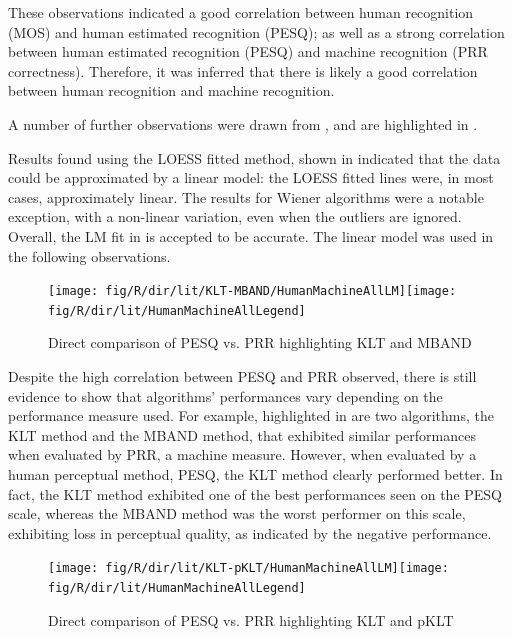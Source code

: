 These observations indicated a good correlation between human recognition
(\ac{MOS}) and human estimated recognition (\ac{PESQ}); as well
as a strong correlation between human estimated recognition (\ac{PESQ})
and machine recognition (\ac{PRR} correctness). Therefore, it was
inferred that there is likely a good correlation between human recognition
and machine recognition.

A number of further observations were drawn from ,
and are highlighted in .

Results found using the \ac{LOESS} fitted method, shown in 
indicated that the data could be approximated by a linear model: the
\ac{LOESS} fitted lines were, in most cases, approximately linear.
The results for Wiener algorithms were a notable exception, with a
non-linear variation, even when the outliers are ignored. Overall,
the \ac{LM} fit in  is accepted to be
accurate. The linear model was used in the following observations.

\begin{figure}[h]
\noindent \begin{centering}
\texttt{[image: fig/R/dir/lit/KLT-MBAND/HumanMachineAllLM]}\texttt{[image: fig/R/dir/lit/HumanMachineAllLegend]}
\par\end{centering}

\protect\caption{\label{fig:direct-klt-mband}Direct comparison of \acs{PESQ} vs.
\acs{PRR} highlighting \acs{KLT} and \acs{MBAND}}
\end{figure}


Despite the high correlation between \ac{PESQ} and \ac{PRR} observed,
there is still evidence to show that algorithms' performances vary
depending on the performance measure used. For example, highlighted
in  are two algorithms, the \ac{KLT} method
and the \ac{MBAND} method, that exhibited similar performances when
evaluated by \ac{PRR}, a machine measure. However, when evaluated
by a human perceptual method, \ac{PESQ}, the \ac{KLT} method clearly
performed better. In fact, the \ac{KLT} method exhibited one of the
best performances seen on the \ac{PESQ} scale, whereas the \ac{MBAND}
method was the worst performer on this scale, exhibiting loss in perceptual
quality, as indicated by the negative performance.

\begin{figure}[h]
\noindent \begin{centering}
\texttt{[image: fig/R/dir/lit/KLT-pKLT/HumanMachineAllLM]}\texttt{[image: fig/R/dir/lit/HumanMachineAllLegend]}
\par\end{centering}

\protect\caption{\label{fig:direct-klt-pklt}Direct comparison of \acs{PESQ} vs. \acs{PRR}
highlighting \acs{KLT} and \acs{pKLT}}
\end{figure}



